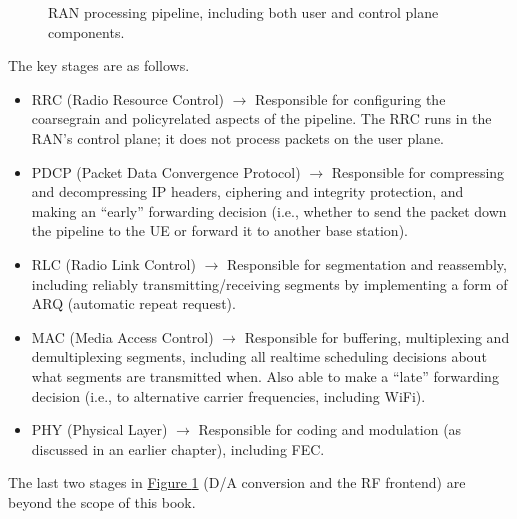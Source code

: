 \documentclass[a4paper,11pt,english]{sphinxmanual}
\let\sphinxpxdimen\pdfpxdimen\else\newdimen\sphinxpxdimen
\begin{document}
\begin{figure}[ht]
\centering
\capstart

\noindent\sphinxincludegraphics[width=600\sphinxpxdimen]{{Slide14}.png}
\caption{RAN processing pipeline, including both user and
control plane components.}\label{\detokenize{ran:id1}}\label{\detokenize{ran:fig-pipeline}}\end{figure}

\sphinxAtStartPar
The key stages are as follows.
\begin{itemize}
\item {} 
\sphinxAtStartPar
RRC (Radio Resource Control) \(\rightarrow\) Responsible for configuring the
coarse\sphinxhyphen{}grain and policy\sphinxhyphen{}related aspects of the pipeline. The RRC runs
in the RAN’s control plane; it does not process packets on the user
plane.

\item {} 
\sphinxAtStartPar
PDCP (Packet Data Convergence Protocol) \(\rightarrow\) Responsible for compressing
and decompressing IP headers, ciphering and integrity protection, and
making an “early” forwarding decision (i.e., whether to send the
packet down the pipeline to the UE or forward it to another base
station).

\item {} 
\sphinxAtStartPar
RLC (Radio Link Control) \(\rightarrow\) Responsible for segmentation and
reassembly, including reliably transmitting/receiving segments by
implementing a form of ARQ (automatic repeat request).

\item {} 
\sphinxAtStartPar
MAC (Media Access Control) \(\rightarrow\) Responsible for buffering, multiplexing
and demultiplexing segments, including all real\sphinxhyphen{}time scheduling
decisions about what segments are transmitted when. Also able to make
a “late” forwarding decision (i.e., to alternative carrier
frequencies, including Wi\sphinxhyphen{}Fi).

\item {} 
\sphinxAtStartPar
PHY (Physical Layer) \(\rightarrow\) Responsible for coding and modulation (as
discussed in an earlier chapter), including FEC.

\end{itemize}

\sphinxAtStartPar
The last two stages in \hyperref[\detokenize{ran:fig-pipeline}]{Figure \ref{\detokenize{ran:fig-pipeline}}} (D/A
conversion and the RF front\sphinxhyphen{}end) are beyond the scope of this book.
\end{document}
